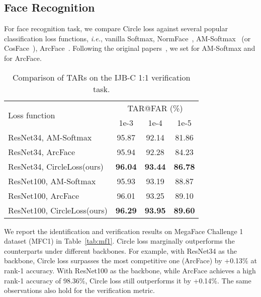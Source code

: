 \documentclass[10pt,twocolumn,letterpaper]{article}
\begin{document}
\subsection{Face Recognition}\label{sec:exp_face}






For face recognition task, we compare Circle loss against several popular classification loss functions, \emph{i.e.}, vanilla Softmax, NormFace~\cite{wang2017normface}, AM-Softmax~\cite{wang2018additive} (or CosFace~\cite{Wang_2018_CVPR}), ArcFace~\cite{deng2019arcface}. Following the original papers~\cite{wang2018additive, deng2019arcface}, we set  for AM-Softmax and  for ArcFace. 

\begin{table}[t]
    \small
    \centering
    \caption{Comparison of TARs on the IJB-C 1:1 verification task.}
    \label{tab:ijb-c}
    \begin{tabularx}{\linewidth}{Xccc}
    \toprule
     \multirow{2}{*}{Loss function} & \multicolumn{3}{c}{TAR@FAR (\%)} \\
     \cmidrule{2-4}
     & 1e-3 & 1e-4 & 1e-5 \\
     \midrule
    ResNet34, AM-Softmax~\cite{wang2018additive,Wang_2018_CVPR} & 95.87 & 92.14 & 81.86\\
    ResNet34, ArcFace~\cite{deng2019arcface} 	&95.94 & 92.28 & 84.23\\
    ResNet34, CircleLoss(ours) & \textbf{96.04} & \textbf{93.44} & \textbf{86.78} \\
    \hline
    ResNet100, AM-Softmax~\cite{wang2018additive,Wang_2018_CVPR} & 95.93 & 93.19 & 88.87\\
    ResNet100, ArcFace~\cite{deng2019arcface} 	&96.01 & 93.25 & 89.10\\
    ResNet100, CircleLoss(ours) & \textbf{96.29} & \textbf{93.95} & \textbf{89.60} \\
    \bottomrule
    \end{tabularx}
\end{table}



We report the identification and verification results on MegaFace Challenge 1 dataset (MFC1) in Table~\ref{tab:mf1}. Circle loss marginally outperforms the counterparts under different backbones. For example, with ResNet34 as the backbone, Circle loss surpasses the most competitive one (ArcFace) by +0.13\% at rank-1 accuracy. With ResNet100 as the backbone, while ArcFace achieves a high rank-1 accuracy of 98.36\%, Circle loss still outperforms it by +0.14\%. The same observations also hold for the verification metric.
\end{document}
